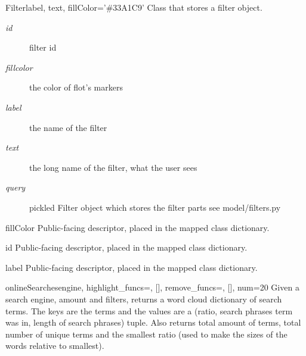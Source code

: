 \documentclass[letterpaper,10pt,english]{manual}
\begin{document}

\hypertarget{webscavator.model.models.Filter}{}\begin{classdesc}{Filter}{label, text, fillColor='\#33A1C9'}
Class that stores a filter object.
\begin{description}
\item[\emph{id}]
filter id

\item[\emph{fillcolor}]
the color of flot's markers

\item[\emph{label}]
the name of the filter

\item[\emph{text}]
the long name of the filter, what the user sees

\item[\emph{query}]
pickled Filter object which stores the filter parts see model/filters.py

\end{description}

\hypertarget{webscavator.model.models.Filter.fillColor}{}\begin{memberdesc}{fillColor}
Public-facing descriptor, placed in the mapped class dictionary.
\end{memberdesc}

\hypertarget{webscavator.model.models.Filter.id}{}\begin{memberdesc}{id}
Public-facing descriptor, placed in the mapped class dictionary.
\end{memberdesc}

\hypertarget{webscavator.model.models.Filter.label}{}\begin{memberdesc}{label}
Public-facing descriptor, placed in the mapped class dictionary.
\end{memberdesc}

\hypertarget{webscavator.model.models.Filter.onlineSearches}{}\begin{staticmethoddesc}{onlineSearches}{engine, highlight\_funcs=, {[}{]}, remove\_funcs=, {[}{]}, num=20}
Given a search engine, amount and filters, returns a word cloud dictionary of search terms.
The keys are the terms and the values are a (ratio, search phrases term was in, 
length of search phrases) tuple. Also returns total amount of terms, total number of unique 
terms and the smallest ratio (used to make the sizes of the words relative to smallest).
\end{staticmethoddesc}


\end{classdesc}
\end{document}

